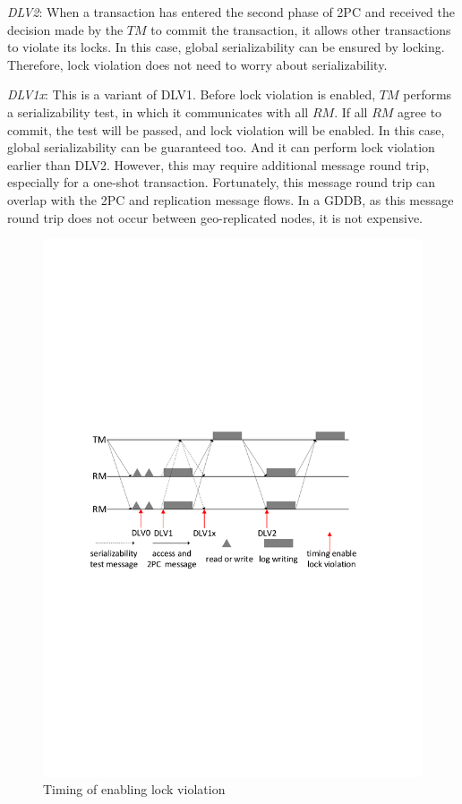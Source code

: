 \documentclass[conference]{IEEEtran}
\begin{document}
\emph{DLV2}:
When a transaction has entered the second phase of 2PC and received the decision made by the ${TM}$ to commit the transaction, it allows other transactions to violate its locks.
In this case, global serializability can be ensured by locking. Therefore, lock violation does not need to worry about serializability.

\emph{DLV1x}:
This is a variant of DLV1.
Before lock violation is enabled, ${TM}$ performs a serializability test, in which it communicates with all ${RM}$.
If all ${RM}$ agree to commit, the test will be passed, and lock violation will be enabled.
In this case, global serializability can be guaranteed too. And it can perform lock violation earlier than DLV2.
However, this may require additional message round trip, especially for a one-shot transaction.
Fortunately, this message round trip can overlap with the 2PC and replication message flows.
In a GDDB, as this message round trip does not occur between geo-replicated nodes, it is not expensive.

\begin{figure}[tbp]
  \centerline{\includegraphics[scale=0.50]{figure/lock_violation_time.pdf}}
  \caption
  {Timing of enabling lock violation}
\label{fig:lock_violation_time}
\end{figure}
\end{document}
